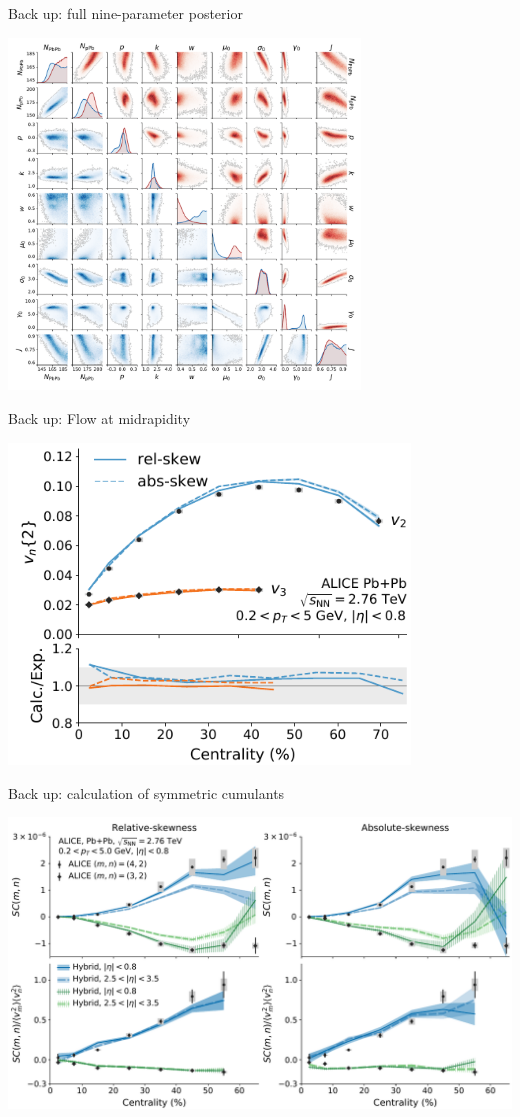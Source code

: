 \documentclass[11pt]{beamer}
\begin{document}
\begin{frame}{Back up: full nine-parameter posterior}
\begin{center}
\includegraphics[width=0.7\textwidth]{posterior.pdf}
\end{center}
\end{frame}

\begin{frame}{Back up: Flow at midrapidity}
\begin{center}
\includegraphics[width=0.8\textwidth]{vn_cen.pdf}
\end{center}
\end{frame}

\begin{frame}{Back up: calculation of symmetric cumulants}
\begin{center}
\includegraphics[width=\textwidth]{smn.pdf}
\end{center}
\end{frame}
\end{document}
